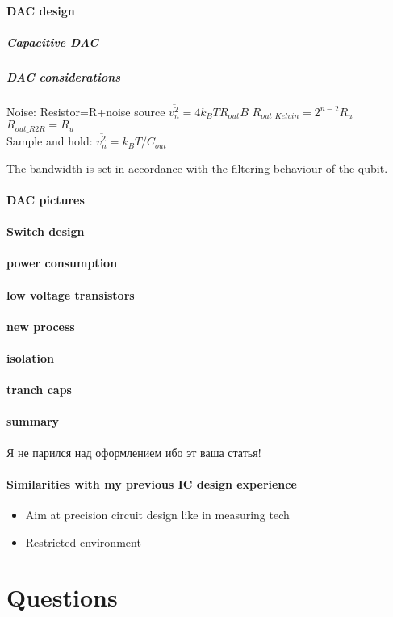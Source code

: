 \documentclass[a4paper,12pt]{article} %
\begin{document}
\paragraph{DAC design}
\subparagraph{Capacitive DAC}
\subparagraph{DAC considerations} Noise: Resistor=R+noise source  $ \overline{v_n^2} = 4k_BTR_{out}B  $ \hspace{2mm}
$R_{out\_Kelvin}=2^{n-2}R_u$ \\
$R_{out\_R2R}=R_u$ \\
Sample and hold: $\overline{v_n^2} = k_BT/C_{out}$


The bandwidth is set in accordance with the filtering behaviour of the qubit.


\paragraph{DAC pictures}


\paragraph{Switch design}

\paragraph{power consumption}

\paragraph{low voltage transistors}

\paragraph{new process}

\paragraph{isolation}

\paragraph{tranch caps}

\paragraph{summary} Я не парился над оформлением ибо эт ваша статья!


\paragraph{Similarities with my previous IC design experience}
\begin{itemize}
    \item Aim at precision circuit design like in measuring tech
    \item Restricted environment
\end{itemize}

\section{Questions}
\end{document}
